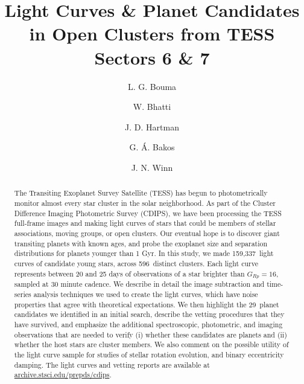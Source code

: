 \documentclass[12pt,twocolumn,tighten]{aastex62}
\newcommand{\numberpcs}{29\ }  %
\newcommand{\numberlcs}{159{,}337\ } %
\newcommand{\numberclusters}{596\ } %
\newcommand{\stscilink} {\url{archive.stsci.edu/prepds/cdips}}
\begin{document}
\title{
  Light Curves \& Planet Candidates in Open Clusters from TESS Sectors 6 \& 7
}


\author[0000-0002-0514-5538]{L. G. Bouma}
%
\author[0000-0002-0628-0088]{W. Bhatti}
%
\author[0000-0001-8732-6166]{J. D. Hartman}
%
\author[0000-0001-7204-6727]{G. \'A. Bakos}
%
\author[0000-0002-4265-047X]{J. N. Winn}

\begin{abstract}
  The Transiting Exoplanet Survey Satellite (TESS) has begun to
  photometrically monitor almost every star cluster in
  the solar neighborhood.
  As part of the Cluster Difference Imaging Photometric Survey
  (CDIPS), we have been processing the TESS full-frame images and
  making light curves of stars that could be members of stellar
  associations, moving groups, or open clusters.
  Our eventual hope is to discover giant transiting planets with known
  ages, and probe the exoplanet size and separation distributions for
  planets younger than 1 Gyr.
  In this study, we made \numberlcs light curves of candidate young
  stars, across \numberclusters distinct clusters.
  Each light curve represents between 20 and 25 days of observations
  of a star brighter than $G_{Rp}=16$, sampled at 30 minute cadence.
  We describe in detail the image subtraction and time-series analysis 
  techniques we used to create the light curves, which
  have noise properties that agree with theoretical expectations.
  We then highlight the \numberpcs planet candidates we identified in
  an initial search, describe the vetting procedures that they have
  survived, and emphasize the additional spectroscopic, photometric,
  and imaging observations that are needed to verify (i) whether these
  candidates are planets and (ii) whether the host stars are cluster members.
  We also comment on the possible utility of the light curve sample for
  studies of stellar rotation evolution, and binary eccentricity
  damping.
  The light curves and vetting reports are available at
  \stscilink.
\end{abstract}
\end{document}
